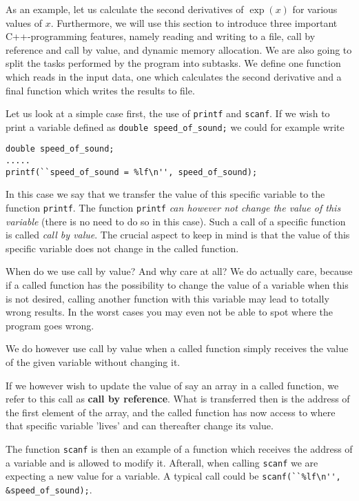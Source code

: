 As an example, let us calculate  
the second derivatives of $\exp{(x)}$ for various values of $x$. 
Furthermore, we will use this section to introduce three
important C++-programming features, namely reading and writing to
a file, call by reference and call by value, and dynamic memory allocation.
We are also going to split the tasks performed
by the program into subtasks. We define one function
which reads in the input data, one which calculates the second derivative
and a final function
which writes the results to file.


Let us look at a simple case first, the use of 
\verb?printf? and \verb?scanf?. If we wish to print
a  variable defined as  
\verb?double speed_of_sound;?
we could  for example write 
\begin{lstlisting}
double speed_of_sound;
.....
printf(``speed_of_sound = %lf\n'', speed_of_sound);
\end{lstlisting}

In this case we say that we transfer the value of this specific variable
to the function \verb?printf?. The function \verb?printf? 
{\em can however not change the value of this variable} 
(there is no need to do so in this case). 
Such a call
of a specific  function is called {\em call by value}. 
The crucial aspect to keep in mind is that the value of this
specific variable does not change in the called function.

When do we use call by value? And why care at all? 
We do actually care, because if a called function has the possibility
to change the value of a variable when this is not desired,
calling another function with this variable may lead to totally wrong
results. In the worst cases you may even not be able to spot where the
program goes wrong. 

We do however use call by value when a called function
simply receives the value of the given variable without changing it.

If we however wish to update the value of say an array 
in a called function, we refer to this call as {\bf call by reference}.
What is transferred then is the address of the first element of the array,
and the called function has now access to where that specific
variable 'lives' and can thereafter change its value. 

The function \verb?scanf? is then an example of a function which receives
the address of a variable and is allowed to modify it. Afterall, when calling
\verb?scanf? we are expecting a new value for a variable. 
A typical call could be
\verb?scanf(``%lf\n'', &speed_of_sound);?.

